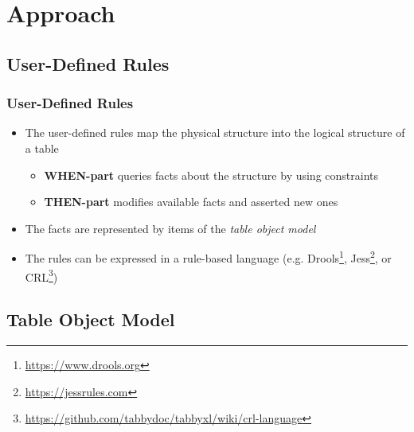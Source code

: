 \documentclass{beamer}
\begin{document}
\section{Approach}

\subsection{User-Defined Rules}

\begin{frame}
\frametitle{User-Defined Rules}
\begin{itemize}
\item The user-defined rules map the physical structure into the logical structure of a table
\begin{itemize}
\item \textbf{WHEN-part} queries facts about the structure by using constraints
\item \textbf{THEN-part} modifies available facts and asserted new ones
\end{itemize}
\item The facts are represented by items of the \emph{table object model}
\item The rules can be expressed in a rule-based language
(e.g. Drools\footnote{\url{https://www.drools.org}}, Jess\footnote{\url{https://jessrules.com}}, or CRL\footnote{\url{https://github.com/tabbydoc/tabbyxl/wiki/crl-language}})
\end{itemize}
\end{frame}

\subsection{Table Object Model}
\end{document}
